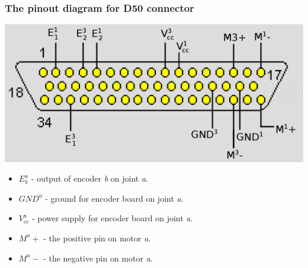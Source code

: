 \documentclass{beamer}
\begin{document}
  \begin{frame}
    \frametitle{The pinout diagram for D50 connector}
    \centering
    \includegraphics[scale=0.25]{../Report/dsub50.png}
    \begin{itemize}
      \item \( E^a_b \) - output of encoder \textit{b} on joint
        \textit{a}.
      \item \( GND^a \) - ground for encoder board on joint
        \textit{a}.
      \item \( V^a_{cc} \) - power supply for encoder board on joint
        \textit{a}.
      \item \( M^a+ \) - the positive pin on motor \textit{a}.
      \item \( M^a- \) - the negative pin on motor \textit{a}.
      \end{itemize}
  \end{frame}
\end{document}
